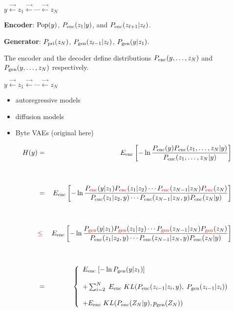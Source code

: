 {
\centerline{$y \stackrel{\rightarrow}{\leftarrow} z_1  \stackrel{\rightarrow}{\leftarrow} \cdots \stackrel{\rightarrow}{\leftarrow} z_N$}

\vfill
{\bf Encoder}: $\mathrm{Pop}(y)$, $P_{\mathrm{enc}}(z_1|y)$, and $P_{\mathrm{enc}}(z_{\ell+1}|z_\ell)$.


\vfill
{\bf Generator}: $P_{\mathrm{pri}}(z_N)$, $P_{\mathrm{gen}}(z_{\ell-1}|z_\ell)$, $P_{\mathrm{gen}}(y|z_1)$.

\vfill
The encoder and the decoder define distributions $P_{\mathrm{enc}}(y,\ldots,z_N)$ and $P_{\mathrm{gen}}(y,\ldots,z_N)$ respectively.



\centerline{$y \stackrel{\rightarrow}{\leftarrow} z_1  \stackrel{\rightarrow}{\leftarrow} \cdots \stackrel{\rightarrow}{\leftarrow} z_N$}

\vfill
\begin{itemize}
\item autoregressive models

\vfill
\item diffusion models

\vfill
\item Byte VAEs (original here)
\end{itemize}



{\Large
\begin{eqnarray*}
H(y) & = & E_{\mathrm{enc}}\left[- \ln\frac{P_{\mathrm{enc}}(y)P_{\mathrm{enc}}(z_1,\ldots,z_N|y)}{P_{\mathrm{enc}}(z_1,\ldots,z_N|y)}\right]\\
  \\
  \\
  & = & E_{\mathrm{enc}}\left[ - \ln\frac{P_{\color{red} \mathrm{enc}}(y|z_1)P_{\color{red} \mathrm{enc}}(z_1|z_2)\cdots P_{\color{red} \mathrm{enc}}(z_{N-1}|z_N)P_{\color{red} \mathrm{enc}}(z_N)}
  {P_{\mathrm{enc}}(z_1|z_2,y)\cdots P_{\mathrm{enc}}(z_{N-1}|z_N,y)P_{\mathrm{enc}}(z_N|y)}\right] \\
   \\
   \\
  & {\color{red} \leq} & E_{\mathrm{enc}}\left[ - \ln\frac{P_{\color{red} \mathrm{gen}}(y|z_1)P_{\color{red} \mathrm{gen}}(z_1|z_2)\cdots P_{\color{red} \mathrm{gen}}(z_{N-1}|z_N)P_{\color{red} \mathrm{gen}}(z_N)}
  {P_{\mathrm{enc}}(z_1|z_2,y)\cdots P_{\mathrm{enc}}(z_{N-1}|z_N,y)P_{\mathrm{enc}}(z_N|y)}\right] \\
\\
\\
 & = & \left\{\begin{array}{l}E_{\mathrm{enc}}\;[-\ln P_{\mathrm{gen}}(y|z_1)]
                             \\ \\ + \sum_{i=2}^N  \; E_{\mathrm{enc}}\; KL(P_{\mathrm{enc}}(z_{i-1}|z_i,y),\;P_{\mathrm{gen}}(z_{i-1}|z_i)) \\
                             \\ + E_{\mathrm{enc}}\; KL(P_{\mathrm{enc}}(Z_N|y),p_{\mathrm{gen}}(Z_N))\end{array}\right.
\end{eqnarray*}
}

}
